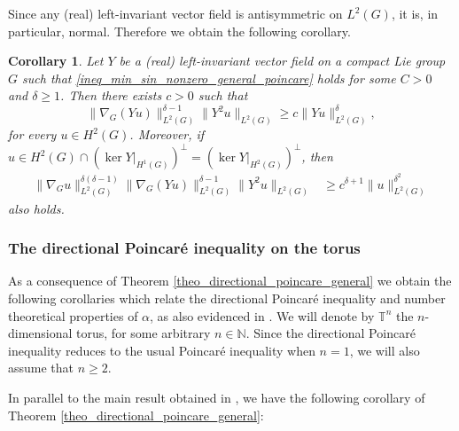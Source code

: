 \documentclass[11pt]{amsart}
\numberwithin{theorem}{section}
\numberwithin{equation}{section}
\newtheorem{corollary}[theorem]{Corollary}
\theoremstyle{definition}
\numberwithin{example}{section}
\theoremstyle{definition}
\theoremstyle{definition}
\newcommand{\N}{\mathbb{N}}
\newcommand{\T}{\mathbb{T}}
\begin{document}
Since any (real) left-invariant vector field is antisymmetric on $L^2(G)$, it is, in particular, normal. Therefore we obtain the following corollary.
\begin{corollary}
    Let $Y$ be a (real) left-invariant vector field on a compact Lie group $G$ such that \eqref{ineq_min_sin_nonzero_general_poincare} holds for some $C>0$ and $\delta\geq 1$. Then there exists  $c>0$ such that
        \begin{equation*}
            \|\nabla_G (Yu)\|_{L^2(G)}^{\delta-1}\|Y^2u\|_{L^2(G)}\geq c\|Yu\|_{L^2(G)}^\delta,
        \end{equation*}
        for every $u\in H^{2}(G)$. Moreover, if $u\in H^{2}(G)\cap (\ker Y|_{H^1(G)})^\perp=(\ker Y|_{H^2(G)})^\perp$, then 
         \begin{align*}
        \|\nabla_G u\|^{\delta(\delta-1)}_{L^2(G)} \|\nabla_G (Yu)\|_{L^2(G)}^{\delta-1}\|Y^2u\|_{L^2(G)}&\geq c^{\delta+1}\|u\|_{L^2(G)}^{\delta^2}
    \end{align*}
    also holds.
\end{corollary}


\subsubsection{The directional Poincaré inequality on the torus}

{As a consequence of Theorem \ref{theo_directional_poincare_general} we obtain the following corollaries which relate the directional Poincaré inequality and number theoretical properties of $\alpha$, as also evidenced  in \cite{directional_Poincare}.} We  will denote by $\T^n$ the $n$-dimensional torus, for some arbitrary $n\in\N$. Since the directional Poincaré inequality reduces to the usual Poincaré inequality when $n=1$, we will also assume that $n\geq 2$.

In parallel to the main result obtained in \cite{directional_Poincare}, we have the following corollary of Theorem \ref{theo_directional_poincare_general}:
\end{document}
